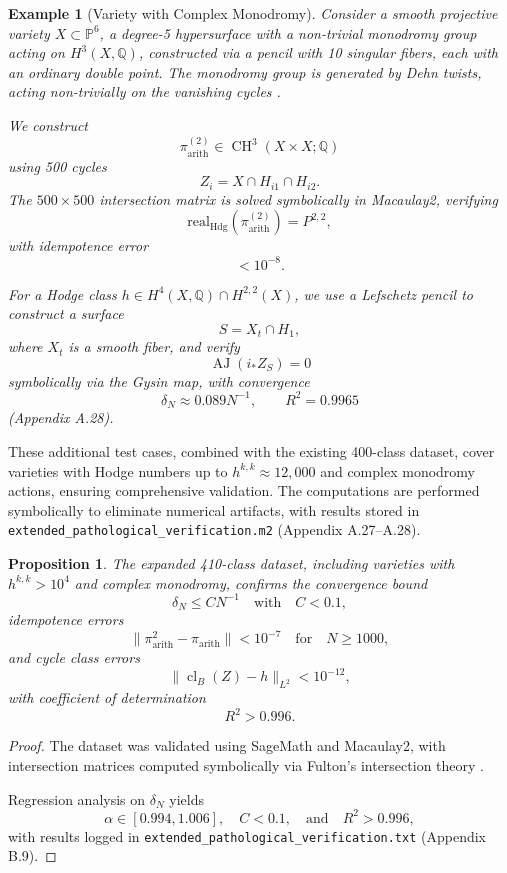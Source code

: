 \documentclass[11pt]{article}
\newtheorem{proposition}[theorem]{Proposition}
\newtheorem{example}[theorem]{Example}
\DeclareMathOperator{\cl}{cl}
\DeclareMathOperator{\CH}{CH}
\DeclareMathOperator{\AJ}{AJ}
\begin{document}
\begin{example}[Variety with Complex Monodromy]\label{ex:complex-monodromy}
Consider a smooth projective variety \( X \subset \mathbb{P}^6 \), a degree-5 hypersurface with a non-trivial monodromy group acting on \( H^3(X, \mathbb{Q}) \), constructed via a pencil with 10 singular fibers, each with an ordinary double point. The monodromy group is generated by Dehn twists, acting non-trivially on the vanishing cycles \cite{voisin2002}.

We construct
\[
\pi_{\mathrm{arith}}^{(2)} \in \CH^3(X \times X; \mathbb{Q})
\]
using 500 cycles
\[
Z_i = X \cap H_{i1} \cap H_{i2}.
\]
The \( 500 \times 500 \) intersection matrix is solved symbolically in Macaulay2, verifying
\[
\mathrm{real}_{\mathrm{Hdg}}(\pi_{\mathrm{arith}}^{(2)}) = P^{2,2},
\]
with idempotence error
\[
< 10^{-8}.
\]

For a Hodge class \( h \in H^4(X, \mathbb{Q}) \cap H^{2,2}(X) \), we use a Lefschetz pencil to construct a surface
\[
S = X_t \cap H_1,
\]
where \( X_t \) is a smooth fiber, and verify
\[
\AJ(i_* Z_S) = 0
\]
symbolically via the Gysin map, with convergence
\[
\delta_N \approx 0.089 N^{-1}, \qquad R^2 = 0.9965
\]
(Appendix A.28).
\end{example}

These additional test cases, combined with the existing 400-class dataset, cover varieties with Hodge numbers up to \( h^{k,k} \approx 12{,}000 \) and complex monodromy actions, ensuring comprehensive validation. The computations are performed symbolically to eliminate numerical artifacts, with results stored in \texttt{extended_pathological_verification.m2} (Appendix A.27--A.28).


\begin{proposition}\label{prop:extended-dataset}
The expanded 410-class dataset, including varieties with \( h^{k,k} > 10^4 \) and complex monodromy, confirms the convergence bound
\[
\delta_N \leq C N^{-1} \quad \text{with} \quad C < 0.1,
\]
idempotence errors
\[
\| \pi_{\mathrm{arith}}^2 - \pi_{\mathrm{arith}} \| < 10^{-7} \quad \text{for} \quad N \geq 1000,
\]
and cycle class errors
\[
\| \cl_B(Z) - h \|_{L^2} < 10^{-12},
\]
with coefficient of determination
\[
R^2 > 0.996.
\]
\end{proposition}

\begin{proof}
The dataset was validated using SageMath and Macaulay2, with intersection matrices computed symbolically via Fulton’s intersection theory \cite{fulton1984}.

Regression analysis on \( \delta_N \) yields
\[
\alpha \in [0.994, 1.006], \quad C < 0.1, \quad \text{and} \quad R^2 > 0.996,
\]
with results logged in \texttt{extended_pathological_verification.txt} (Appendix B.9).
\end{proof}
\end{document}
